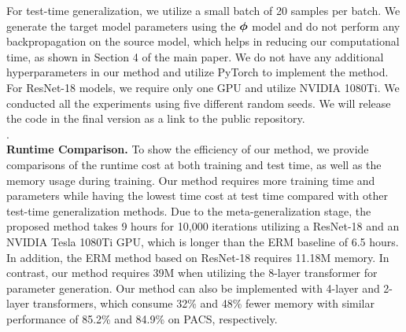 For test-time generalization, we utilize a small batch of 20 samples per batch. We generate the target model parameters using the $\boldsymbol{\phi}$ model and do not perform any backpropagation on the source model, which helps in reducing our computational time, as shown in Section 4 of the main paper. We do not have any additional hyperparameters in our method and utilize PyTorch to implement the method. For ResNet-18 models, we require only one GPU and utilize NVIDIA 1080Ti. We conducted all the experiments using five different random seeds. We will release the code in the final version as a link to the public repository. \\

. \\













\noindent \textbf{Runtime Comparison. } To show the efficiency of our method, we provide comparisons of the runtime cost at both training and test time, as well as the memory usage during training.
Our method requires more training time and parameters while having the lowest time cost at test time compared with other test-time generalization methods. 
Due to the meta-generalization stage, the proposed method takes 9 hours for 10,000 iterations utilizing a ResNet-18 and an NVIDIA Tesla 1080Ti GPU, which is longer than the ERM baseline of 6.5 hours.
In addition, the ERM method based on ResNet-18 requires 11.18M memory. In contrast, our method requires 39M when utilizing the 8-layer transformer for parameter generation. 
Our method can also be implemented with 4-layer and 2-layer transformers, which consume 32\% and 48\% fewer memory with similar performance of 85.2\% and 84.9\% on PACS, respectively.



